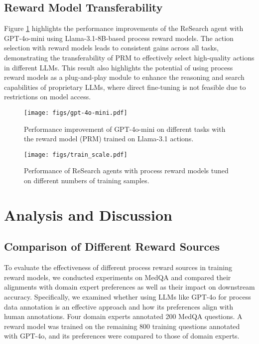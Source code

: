 \subsection{Reward Model Transferability}



Figure \ref{fig:gpt-4o-mini} highlights the performance improvements of the ReSearch agent with GPT-4o-mini using Llama-3.1-8B-based process reward models. The action selection with reward models leads to consistent gains across all tasks, demonstrating the transferability of PRM to effectively select high-quality actions in different LLMs. This result also highlights the potential of using process reward models as a plug-and-play module to enhance the reasoning and search capabilities of proprietary LLMs, where direct fine-tuning is not feasible due to restrictions on model access. 

\begin{figure}[h!]
    \centering
    \texttt{[image: figs/gpt-4o-mini.pdf]}
    \caption{Performance improvement of GPT-4o-mini on different tasks with the reward model (PRM) trained on Llama-3.1 actions.}
    \label{fig:gpt-4o-mini}
\end{figure}


\begin{figure*}[h!] 
    \centering
    \texttt{[image: figs/train\_scale.pdf]}
    \caption{Performance of ReSearch agents with process reward models tuned on different numbers of training samples.}
    \label{fig:train_scale}
\end{figure*}


\section{Analysis and Discussion} \label{sec:discussions}

\subsection{Comparison of Different Reward Sources}
To evaluate the effectiveness of different process reward sources in training reward models, we conducted experiments on MedQA and compared their alignments with domain expert preferences as well as their impact on downstream accuracy. Specifically, we examined whether using LLMs like GPT-4o for process data annotation is an effective approach and how its preferences align with human annotations. Four domain experts annotated 200 MedQA questions. A reward model was trained on the remaining 800 training questions annotated with GPT-4o, and its preferences were compared to those of domain experts.

